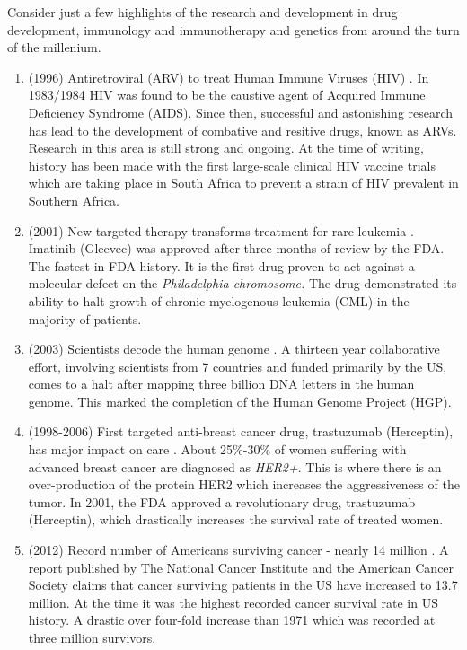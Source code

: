 Consider just a few highlights of the research and development in drug development, immunology and immunotherapy and genetics from around the turn of the millenium.
\begin{enumerate}
	\item (1996) Antiretroviral (ARV) to treat Human Immune Viruses (HIV) \citep{Lange2014}. 
	In 1983/1984 HIV was found to be the caustive agent of Acquired Immune Deficiency Syndrome (AIDS). Since then, successful and astonishing research has lead to the development of combative and resitive drugs, known as ARVs. Research in this area is still strong and ongoing. At the time of writing, history has been made with the first large-scale clinical HIV vaccine trials which are taking place in South Africa to prevent a strain of HIV prevalent in Southern Africa.
	
	\item (2001) New targeted therapy transforms treatment for rare leukemia \citep{Druker2001}.
	Imatinib (Gleevec) was approved after three months of review by the FDA. The fastest in FDA history. It is the first drug proven to act against a molecular defect on the \textit{Philadelphia chromosome.} The drug demonstrated its ability to halt growth of chronic myelogenous leukemia (CML) in the majority of patients.
	
	\item (2003) Scientists decode the human genome \citep{HGP2013}. A thirteen year collaborative effort, involving scientists from 7 countries and funded primarily by the US, comes to a halt after mapping three billion DNA letters in the human genome. This marked the completion of the Human Genome Project (HGP).
	
	\item (1998-2006) First targeted anti-breast cancer drug, trastuzumab (Herceptin), has major impact on care \citep{Slamon2001}. About 25\%-30\% of women suffering with advanced breast cancer are diagnosed as \textit{HER2+}. This is where there is an over-production of the protein HER2 which increases the aggressiveness of the tumor. In 2001, the FDA approved a revolutionary drug, trastuzumab (Herceptin), which drastically increases the survival rate of treated women.

	\item (2012) Record number of Americans surviving cancer - nearly 14 million \citep{MMWR2011}.
	A report published by The National Cancer Institute and the American Cancer Society claims that cancer surviving patients in the US have increased to 13.7 million. At the time it was the highest recorded cancer survival rate in US history. A drastic over four-fold increase than 1971 which was recorded at three million survivors.
\end{enumerate}

